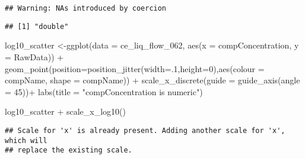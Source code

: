 \documentclass[
]{book}
\newenvironment{Shaded}{\begin{snugshade}}{\end{snugshade}}
\newcommand{\AttributeTok}[1]{\textcolor[rgb]{0.77,0.63,0.00}{#1}}
\newcommand{\DecValTok}[1]{\textcolor[rgb]{0.00,0.00,0.81}{#1}}
\newcommand{\FunctionTok}[1]{\textcolor[rgb]{0.00,0.00,0.00}{#1}}
\newcommand{\NormalTok}[1]{#1}
\newcommand{\OtherTok}[1]{\textcolor[rgb]{0.56,0.35,0.01}{#1}}
\newcommand{\SpecialCharTok}[1]{\textcolor[rgb]{0.00,0.00,0.00}{#1}}
\newcommand{\StringTok}[1]{\textcolor[rgb]{0.31,0.60,0.02}{#1}}
\begin{document}
\begin{Shaded}
\end{Shaded}

\begin{verbatim}
## Warning: NAs introduced by coercion
\end{verbatim}

\begin{Shaded}
\end{Shaded}

\begin{verbatim}
## [1] "double"
\end{verbatim}

\begin{Shaded}
\begin{Highlighting}[]
\NormalTok{log10\_scatter }\OtherTok{\textless{}{-}}\FunctionTok{ggplot}\NormalTok{(}\AttributeTok{data =}\NormalTok{ ce\_liq\_flow\_062, }\FunctionTok{aes}\NormalTok{(}\AttributeTok{x =}\NormalTok{ compConcentration, }\AttributeTok{y =}\NormalTok{ RawData)) }\SpecialCharTok{+}
  \FunctionTok{geom\_point}\NormalTok{(}\AttributeTok{position=}\FunctionTok{position\_jitter}\NormalTok{(}\AttributeTok{width=}\NormalTok{.}\DecValTok{1}\NormalTok{,}\AttributeTok{height=}\DecValTok{0}\NormalTok{),}\FunctionTok{aes}\NormalTok{(}\AttributeTok{colour =}\NormalTok{ compName, }\AttributeTok{shape =}\NormalTok{ compName)) }\SpecialCharTok{+}
   \FunctionTok{scale\_x\_discrete}\NormalTok{(}\AttributeTok{guide =} \FunctionTok{guide\_axis}\NormalTok{(}\AttributeTok{angle =} \DecValTok{45}\NormalTok{))}\SpecialCharTok{+}
   \FunctionTok{labs}\NormalTok{(}\AttributeTok{title =} \StringTok{"compConcentration is numeric"}\NormalTok{) }


\NormalTok{log10\_scatter }\SpecialCharTok{+} \FunctionTok{scale\_x\_log10}\NormalTok{()}
\end{Highlighting}
\end{Shaded}

\begin{verbatim}
## Scale for 'x' is already present. Adding another scale for 'x', which will
## replace the existing scale.
\end{verbatim}
\end{document}
